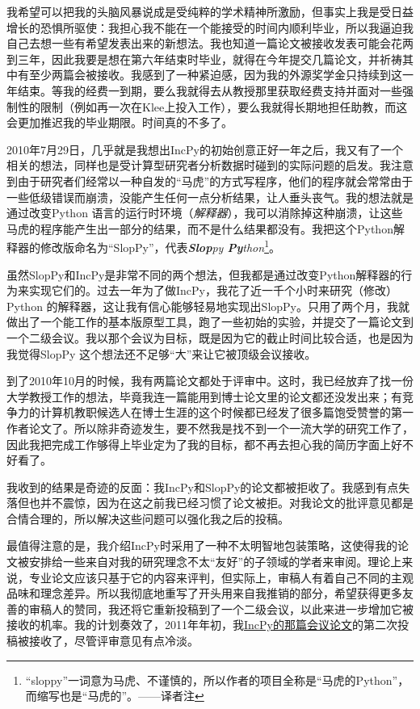 \documentclass[12pt,UTF8,nofonts]{book}
\begin{document}
我希望可以把我的头脑风暴说成是受纯粹的学术精神所激励，但事实上我是受日益增长的恐惧所驱使：我担心我不能在一个能接受的时间内顺利毕业，所以我逼迫我自己去想一些有希望发表出来的新想法。我也知道一篇论文被接收发表可能会花两到三年，因此我要是想在第六年结束时毕业，就得在今年提交几篇论文，并祈祷其中有至少两篇会被接收。我感到了一种紧迫感，因为我的外源奖学金只持续到这一年结束。等我的经费一到期，要么我就得去从教授那里获取经费支持并面对一些强制性的限制（例如再一次在Klee上投入工作），要么我就得长期地担任助教，而这会更加推迟我的毕业期限。时间真的不多了。

2010年7月29日，几乎就是我想出IncPy的初始创意正好一年之后，我又有了一个相关的想法，同样也是受计算型研究者分析数据时碰到的实际问题的启发。我注意到由于研究者们经常以一种自发的“马虎”的方式写程序，他们的程序就会常常由于一些低级错误而崩溃，没能产生任何一点分析结果，让人垂头丧气。我的想法就是通过改变Python 语言的运行时环境（\emph{解释器}），我可以消除掉这种崩溃，让这些马虎的程序能产生出一部分的结果，而不是什么结果都没有。我把这个Python解释器的修改版命名为“SlopPy”，代表\emph{\textbf{Slop}py \textbf{Py}thon}\footnote{``sloppy''一词意为马虎、不谨慎的，所以作者的项目全称是“马虎的Python”，而缩写也是“马虎的”。——译者注}。

虽然SlopPy和IncPy是非常不同的两个想法，但我都是通过改变Python解释器的行为来实现它们的。过去一年为了做IncPy，我花了近一千个小时来研究（修改）Python 的解释器，这让我有信心能够轻易地实现出SlopPy。只用了两个月，我就做出了一个能工作的基本版原型工具，跑了一些初始的实验，并提交了一篇论文到一个二级会议。我以那个会议为目标，既是因为它的截止时间比较合适，也是因为我觉得SlopPy 这个想法还不足够“大”来让它被顶级会议接收。

\breakline

到了2010年10月的时候，我有两篇论文都处于评审中。这时，我已经放弃了找一份大学教授工作的想法，毕竟我连一篇能用到博士论文里的论文都还没发出来；有竞争力的计算机教职候选人在博士生涯的这个时候都已经发了很多篇饱受赞誉的第一作者论文了。所以除非奇迹发生，要不然我是找不到一个一流大学的研究工作了，因此我把完成工作够得上毕业定为了我的目标，都不再去担心我的简历字面上好不好看了。

我收到的结果是奇迹的反面：我IncPy和SlopPy的论文都被拒收了。我感到有点失落但也并不震惊，因为在这之前我已经习惯了论文被拒。对我论文的批评意见都是合情合理的，所以解决这些问题可以强化我之后的投稿。

最值得注意的是，我介绍IncPy时采用了一种不太明智地包装策略，这使得我的论文被安排给一些来自对我的研究理念不太“友好”的子领域的学者来审阅。理论上来说，专业论文应该只基于它的内容来评判，但实际上，审稿人有着自己不同的主观品味和理念差异。所以我彻底地重写了开头用来自我推销的部分，希望获得更多友善的审稿人的赞同，我还将它重新投稿到了一个二级会议，以此来进一步增加它被接收的机率。我的计划奏效了，2011年年初，我\href{http://www.pgbovine.net/projects/pubs/guo_issta11_camera_ready.pdf}{IncPy的那篇会议论文}的第二次投稿被接收了，尽管评审意见有点冷淡。
\end{document}
